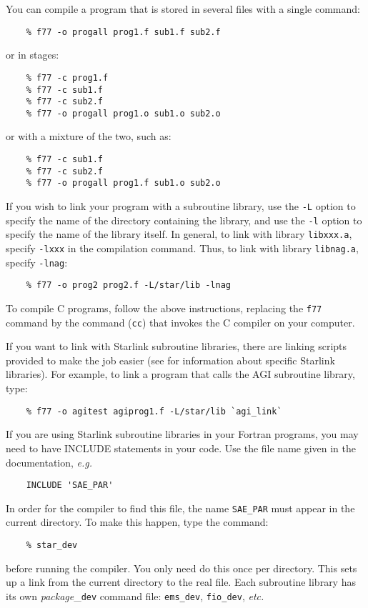 You can compile a program that is stored in several files with a single command:
\begin{verbatim}
    % f77 -o progall prog1.f sub1.f sub2.f
\end{verbatim}
or in stages:
\begin{verbatim}
    % f77 -c prog1.f
    % f77 -c sub1.f
    % f77 -c sub2.f
    % f77 -o progall prog1.o sub1.o sub2.o
\end{verbatim}
or with a mixture of the two, such as:
\begin{verbatim}
    % f77 -c sub1.f
    % f77 -c sub2.f
    % f77 -o progall prog1.f sub1.o sub2.o
\end{verbatim}
If you wish to link your program with a subroutine library, use the {\tt -L}
option to specify the name of the directory containing the library, and use the
{\tt -l} option to specify the name of the library itself.
In general, to link with library {\tt libxxx.a}, specify {\tt -lxxx} in the
compilation command.
Thus, to link with library {\tt libnag.a}, specify {\tt -lnag}:
\begin{verbatim}
    % f77 -o prog2 prog2.f -L/star/lib -lnag
\end{verbatim}
To compile C programs, follow the above instructions, replacing the {\tt f77}
command by the command ({\tt cc}) that invokes the C compiler on your computer.

If you want to link with Starlink subroutine libraries, there are linking
scripts provided to make the job easier (see
 for information about
specific Starlink libraries).
For example, to link a program that calls the AGI
subroutine library, type:
\begin{verbatim}
    % f77 -o agitest agiprog1.f -L/star/lib `agi_link`
\end{verbatim}
If you are using Starlink subroutine libraries in your Fortran programs, you
may need to have INCLUDE statements in your code.
Use the file name given in the documentation, {\em e.g.}
\begin{verbatim}
    INCLUDE 'SAE_PAR'
\end{verbatim}
In order for the compiler to find this file, the name {\tt SAE\_PAR}
must appear in the current directory.
To make this happen, type the command:
\begin{verbatim}
    % star_dev
\end{verbatim}
before running the compiler.
You only need do this once per directory.
This sets up a link from the current directory to the real file.
Each subroutine library has its own {\em package}\_{\tt dev} command file:
{\tt ems\_dev}, {\tt fio\_dev}, {\em etc.}

